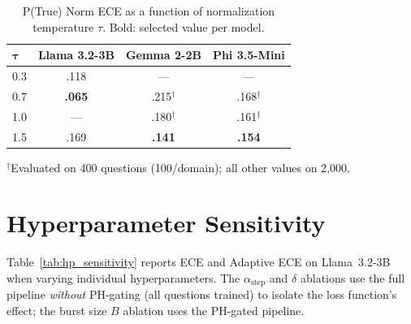 \begin{table}[h]
\centering
\caption{P(True) Norm ECE as a function of normalization 
temperature $\tau$. Bold: selected value per model.}
\label{tab:tau_sweep}
\small
\begin{tabular}{@{}lccc@{}}
\toprule
$\boldsymbol{\tau}$ & \textbf{Llama 3.2-3B} & \textbf{Gemma 2-2B} & \textbf{Phi 3.5-Mini} \\
\midrule
0.3  & .118 & ---  & --- \\
0.7  & \textbf{.065} & .215$^\dagger$ & .168$^\dagger$ \\
1.0  & ---  & .180$^\dagger$ & .161$^\dagger$ \\
1.5  & .169 & \textbf{.141} & \textbf{.154} \\
\bottomrule
\end{tabular}
\vspace{0.3em}
\newline
{\footnotesize $^\dagger$Evaluated on 400 questions (100/domain); all other values on 2{,}000.}
\end{table}


\section{Hyperparameter Sensitivity} \label{app:hp_sensitivity}

Table~\ref{tab:hp_sensitivity} reports ECE and Adaptive ECE on 
Llama~3.2-3B when varying individual hyperparameters.
The $\alpha_{\text{step}}$ and $\delta$ ablations use the full pipeline 
\emph{without} PH-gating (all questions trained) to isolate the loss 
function's effect; the burst size $B$ ablation uses the PH-gated pipeline.

